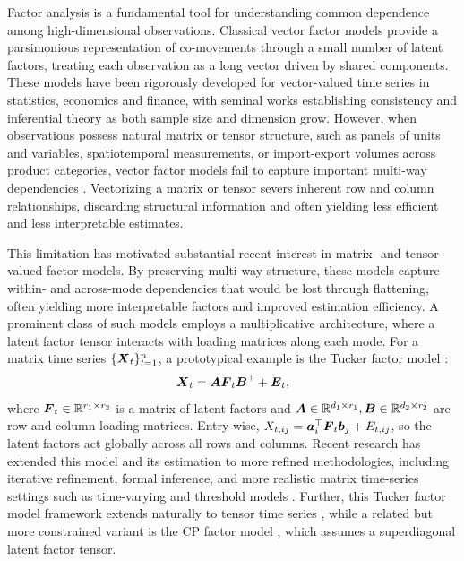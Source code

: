 \documentclass[11pt,letterpaper]{article}
\newcommand{\bfm}[1]{\ensuremath{\boldsymbol{#1}}} %
\def\ba{\bfm a}   \def\bA{\bfm A}  \def\AA{\mathbb{A}}
\def\bb{\bfm b}   \def\bB{\bfm B}  \def\BB{\mathbb{B}}
\theoremstyle{definition}
\begin{document}
Factor analysis is a fundamental tool for understanding common dependence among high-dimensional observations. Classical vector factor models provide a parsimonious representation of co-movements through a small number of latent factors, treating each observation as a long vector driven by shared components. These models have been rigorously developed for vector-valued time series in statistics, economics and finance, with seminal works \citep{connor1986performance, bai2002determining, bai2003inferential, forni2004generalized, forni2005generalized,lam2011estimation, lam2012factor,fan2016projected} establishing consistency and inferential theory as both sample size and dimension grow.
However, when observations possess natural matrix or tensor structure, such as panels of units and variables, spatiotemporal measurements, or import-export volumes across product categories, vector factor models fail to capture important multi-way dependencies \citep{wang2019factor,chen2023statistical}. Vectorizing a matrix or tensor severs inherent row and column relationships, discarding structural information and often yielding less efficient and less interpretable estimates.


This limitation has motivated substantial recent interest in matrix- and tensor-valued factor models. By preserving multi-way structure, these models capture within- and across-mode dependencies that would be lost through flattening, often yielding more interpretable factors and improved estimation efficiency. A prominent class of such models employs a multiplicative architecture, where a latent factor tensor interacts with loading matrices along each mode. For a matrix time series $\{\bX_t\}_{t=1}^n$, a prototypical example is the Tucker factor model \citep{wang2019factor}:
\begin{align*}
\bX_t = \bA \bF_t \bB^\top + \bE_t,    
\end{align*}
where $\bF_t\in\RR^{r_1 \times r_2}$ is a matrix of latent factors and $\bA\in\RR^{d_1\times r_1},\bB\in\RR^{d_2\times r_2}$ are row and column loading matrices. Entry-wise, $X_{t,ij} = \ba_i^\top \bF_t \bb_j + E_{t,ij}$, so the latent factors act globally across all rows and columns. 
Recent research has extended this model and its estimation to more refined methodologies, including iterative refinement, formal inference, and more realistic matrix time-series settings such as time-varying and threshold models
\citep{chen2020constrained,chen2023statistical,yu2022projected,yu2024dynamic,chen2025factor,chen2024time,liu2022identification}.
Further, this Tucker factor model framework extends naturally to tensor time series \citep{chen2022factor, han2022rank,han2024tensor, babii2025tensor, chen2024semi,chen2024rank}, while a related but more constrained variant is the CP factor model \citep{chang2023modelling, chang2024identification, chen2026estimation, han2024cp,chen2025diffusion, bolivar2025threshold}, which assumes a superdiagonal latent factor tensor.
\end{document}
